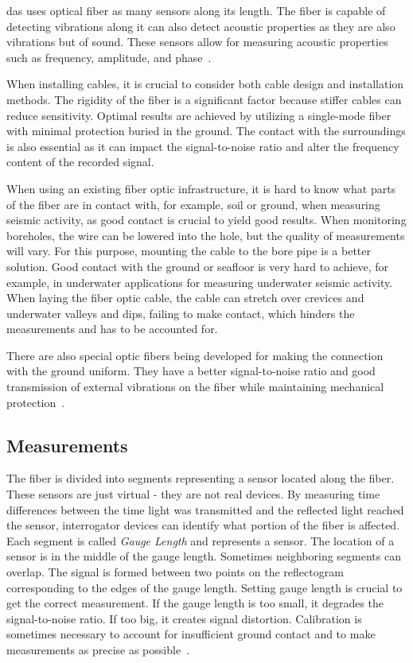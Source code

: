 \ac{das} uses optical fiber as many sensors along its length. The fiber is capable of detecting vibrations along it can also detect acoustic properties as they are also vibrations but of sound. These sensors allow for measuring acoustic properties such as frequency, amplitude, and phase~\cite{WangYu2017RDVM}. 

When installing cables, it is crucial to consider both cable design and installation methods. The rigidity of the fiber is a significant factor because stiffer cables can reduce sensitivity. Optimal results are achieved by utilizing a single-mode fiber with minimal protection buried in the ground. The contact with the surroundings is also essential as it can impact the signal-to-noise ratio and alter the frequency content of the recorded signal.

When using an existing fiber optic infrastructure, it is hard to know what parts of the fiber are in contact with, for example, soil or ground, when measuring seismic activity, as good contact is crucial to yield good results. When monitoring boreholes, the wire can be lowered into the hole, but the quality of measurements will vary. For this purpose, mounting the cable to the bore pipe is a better solution. Good contact with the ground or seafloor is very hard to achieve, for example, in underwater applications for measuring underwater seismic activity. When laying the fiber optic cable, the cable can stretch over crevices and underwater valleys and dips, failing to make contact, which hinders the measurements and has to be accounted for.

There are also special optic fibers being developed for making the connection with the ground uniform. They have a better signal-to-noise ratio and good transmission of external vibrations on the fiber while maintaining mechanical protection~\cite{dasKislov}.

\subsection{Measurements}

The fiber is divided into segments representing a sensor located along the fiber. These sensors are just virtual - they are not real devices. By measuring time differences between the time light was transmitted and the reflected light reached the sensor, interrogator devices can identify what portion of the fiber is affected. Each segment is called \textit{Gauge Length} and represents a sensor. The location of a sensor is in the middle of the gauge length. Sometimes neighboring segments can overlap. The signal is formed between two points on the reflectogram corresponding to the edges of the gauge length. Setting gauge length is crucial to get the correct measurement. If the gauge length is too small, it degrades the signal-to-noise ratio. If too big, it creates signal distortion. Calibration is sometimes necessary to account for insufficient ground contact and to make measurements as precise as possible~\cite{dasKislov}. 

